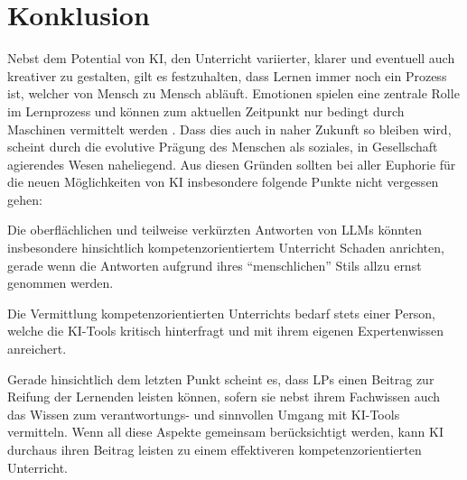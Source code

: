 \section{Konklusion}
Nebst dem Potential von \gls{KI}, den Unterricht variierter, klarer und eventuell auch kreativer zu gestalten, gilt es festzuhalten, dass Lernen immer noch ein Prozess ist, welcher von Mensch zu Mensch abläuft. Emotionen spielen eine zentrale Rolle im Lernprozess und können zum aktuellen Zeitpunkt nur bedingt durch Maschinen vermittelt werden \cite{nzzfolio}. Dass dies auch in naher Zukunft so bleiben wird, scheint durch die evolutive Prägung des Menschen als soziales, in Gesellschaft agierendes Wesen naheliegend. Aus diesen Gründen sollten bei aller Euphorie für die neuen Möglichkeiten von \gls{KI} insbesondere folgende Punkte nicht vergessen gehen: \begin{enumerate*}\item Die oberflächlichen und teilweise verkürzten Antworten von \glspl{LLM} könnten insbesondere hinsichtlich kompetenzorientiertem Unterricht Schaden anrichten, gerade wenn die Antworten aufgrund ihres \enquote{menschlichen} Stils allzu ernst genommen werden. \item Die Vermittlung kompetenzorientierten Unterrichts bedarf stets einer Person, welche die \gls{KI}-Tools kritisch hinterfragt und mit ihrem eigenen Expertenwissen anreichert.
\end{enumerate*} Gerade hinsichtlich dem letzten Punkt scheint es, dass \glspl{LP} einen Beitrag zur Reifung der Lernenden leisten können, sofern sie nebst ihrem Fachwissen auch das Wissen zum verantwortungs- und sinnvollen Umgang mit \gls{KI}-Tools vermitteln. Wenn all diese Aspekte gemeinsam berücksichtigt werden, kann \gls{KI} durchaus ihren Beitrag leisten zu einem effektiveren kompetenzorientierten Unterricht.


\printglossary

\printbibliography


